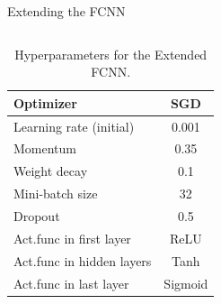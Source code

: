 \documentclass[aspectratio=169, 9pt]{beamer}
\begin{document}
\begin{frame}{Extending the FCNN}
\begin{columns}
\begin{column}{0.5\textwidth}
\begin{table}
\begin{tabular}{|lc|}
      \multicolumn{1}{|l|}{Optimizer}                                        & SGD                                                         \\ \hline
      \multicolumn{1}{|l|}{Learning rate (initial)}                          & 0.001                                                       \\ \hline
      \multicolumn{1}{|l|}{Momentum}                                         & 0.35                                                        \\ \hline
      \multicolumn{1}{|l|}{Weight decay}                                     & 0.1                                                         \\ \hline
      \multicolumn{1}{|l|}{Mini-batch size}                                   & 32                                                          \\ \hline
      \multicolumn{1}{|l|}{Dropout}                                          & 0.5                                                         \\ \hline
      \multicolumn{1}{|l|}{Act.func in first layer}                           & ReLU                                                        \\ \hline
      \multicolumn{1}{|l|}{Act.func in hidden layers}                         & Tanh                                                        \\ \hline
      \multicolumn{1}{|l|}{Act.func in last layer}                           & Sigmoid                                                        \\ \hline
      \end{tabular}
      \caption{Hyperparameters for the Extended FCNN.}
      \end{table}
    \end{column}
  \end{columns}
\end{frame}
\end{document}
